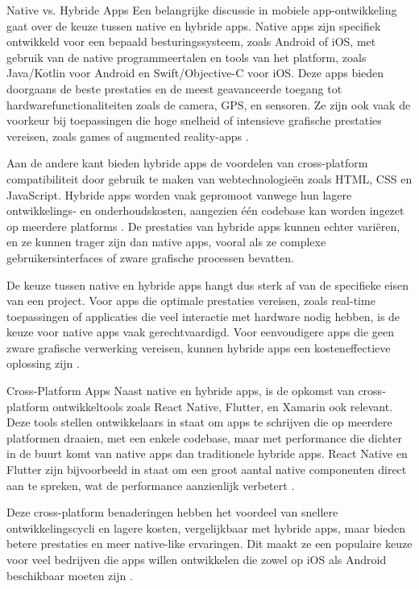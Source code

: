 Native vs. Hybride Apps
Een belangrijke discussie in mobiele app-ontwikkeling gaat over de keuze tussen native en hybride apps. Native apps zijn specifiek ontwikkeld voor een bepaald besturingssysteem, zoals Android of iOS, met gebruik van de native programmeertalen en tools van het platform, zoals Java/Kotlin voor Android en Swift/Objective-C voor iOS. Deze apps bieden doorgaans de beste prestaties en de meest geavanceerde toegang tot hardwarefunctionaliteiten zoals de camera, GPS, en sensoren. Ze zijn ook vaak de voorkeur bij toepassingen die hoge snelheid of intensieve grafische prestaties vereisen, zoals games of augmented reality-apps \autocite{Lau2022}.

Aan de andere kant bieden hybride apps de voordelen van cross-platform compatibiliteit door gebruik te maken van webtechnologieën zoals HTML, CSS en JavaScript. Hybride apps worden vaak gepromoot vanwege hun lagere ontwikkelings- en onderhoudskosten, aangezien één codebase kan worden ingezet op meerdere platforms \autocite{Singh2024}. De prestaties van hybride apps kunnen echter variëren, en ze kunnen trager zijn dan native apps, vooral als ze complexe gebruikersinterfaces of zware grafische processen bevatten.

De keuze tussen native en hybride apps hangt dus sterk af van de specifieke eisen van een project. Voor apps die optimale prestaties vereisen, zoals real-time toepassingen of applicaties die veel interactie met hardware nodig hebben, is de keuze voor native apps vaak gerechtvaardigd. Voor eenvoudigere apps die geen zware grafische verwerking vereisen, kunnen hybride apps een kosteneffectieve oplossing zijn \autocite{Microsoft}.

Cross-Platform Apps
Naast native en hybride apps, is de opkomst van cross-platform ontwikkeltools zoals React Native, Flutter, en Xamarin ook relevant. Deze tools stellen ontwikkelaars in staat om apps te schrijven die op meerdere platformen draaien, met een enkele codebase, maar met performance die dichter in de buurt komt van native apps dan traditionele hybride apps. React Native en Flutter zijn bijvoorbeeld in staat om een groot aantal native componenten direct aan te spreken, wat de performance aanzienlijk verbetert \autocite{Soegaard2024}.

Deze cross-platform benaderingen hebben het voordeel van snellere ontwikkelingscycli en lagere kosten, vergelijkbaar met hybride apps, maar bieden betere prestaties en meer native-like ervaringen. Dit maakt ze een populaire keuze voor veel bedrijven die apps willen ontwikkelen die zowel op iOS als Android beschikbaar moeten zijn \autocite{Amazon}.


